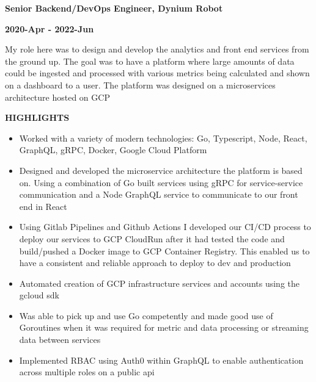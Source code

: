 \documentclass[10pt, a4paper]{article}
\begin{document}
    \vspace*{0.1in}
    {\textbf{Senior Backend/DevOps Engineer, Dynium Robot}} \par
    {\textbf{2020-Apr - 2022-Jun}} \par
    My role here was to design and develop the analytics and front end services from the ground up. The goal was to have a platform where large amounts of data could be ingested and processed with various metrics being calculated and shown on a dashboard to a user. The platform was designed on a microservices architecture hosted on GCP \par
    {\textbf{HIGHLIGHTS}} \par
    \begin{itemize}[label={\large\textbullet}]
      \item Worked with a variety of modern technologies: Go, Typescript, Node, React, GraphQL, gRPC, Docker, Google Cloud Platform
      \item Designed and developed the microservice architecture the platform is based on. Using a combination of Go built services using gRPC for service-service communication and a Node GraphQL service to communicate to our front end in React
      \item Using Gitlab Pipelines and Github Actions I developed our CI/CD process to deploy our services to GCP CloudRun after it had tested the code and build/pushed a Docker image to GCP Container Registry. This enabled us to have a consistent and reliable approach to deploy to dev and production
      \item Automated creation of GCP infrastructure services and accounts using the gcloud sdk
      \item Was able to pick up and use Go competently and made good use of Goroutines when it was required for metric and data processing or streaming data between services
      \item Implemented RBAC using Auth0 within GraphQL to enable authentication across multiple roles on a public api
    \end{itemize}
\end{document}
